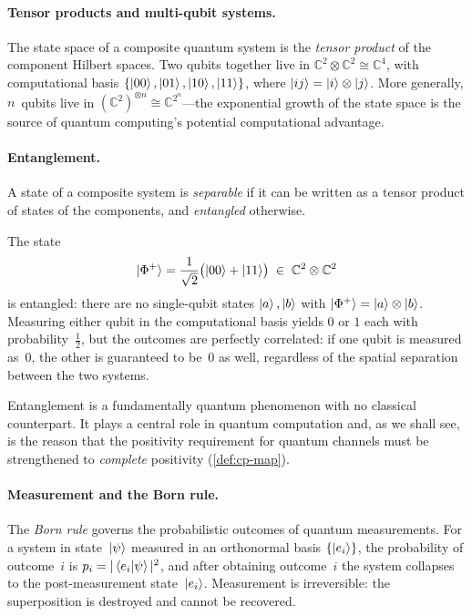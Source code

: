 \paragraph{Tensor products and multi-qubit systems.}
The state space of a composite quantum system is the \emph{tensor
product} of the component Hilbert spaces.
Two qubits together live in
$\mathbb{C}^2 \otimes \mathbb{C}^2 \cong \mathbb{C}^4$, with
computational basis
$\{\ket{00}, \ket{01}, \ket{10}, \ket{11}\}$,
where $\ket{ij} = \ket{i} \otimes \ket{j}$.
More generally, $n$~qubits live in
$(\mathbb{C}^2)^{\otimes n} \cong \mathbb{C}^{2^n}$---the
exponential growth of the state space is the source of quantum
computing's potential computational advantage.

\paragraph{Entanglement.}
A state of a composite system is \emph{separable} if it can be written
as a tensor product of states of the components, and \emph{entangled}
otherwise.

\begin{example}
\label{ex:bell-state}
The state
\[
  \ket{\Phi^+}
  = \frac{1}{\sqrt{2}}\bigl(\ket{00} + \ket{11}\bigr)
  \;\in\; \mathbb{C}^2 \otimes \mathbb{C}^2
\]
is entangled: there are no single-qubit states $\ket{a}, \ket{b}$
with $\ket{\Phi^+} = \ket{a} \otimes \ket{b}$.
Measuring either qubit in the computational basis yields $0$ or $1$
each with probability~$\tfrac{1}{2}$, but the outcomes are perfectly
correlated: if one qubit is measured as~$0$, the other is
guaranteed to be~$0$ as well, regardless of the spatial separation
between the two systems.
\end{example}

\noindent
Entanglement is a fundamentally quantum phenomenon with no classical
counterpart.
It plays a central role in quantum computation and, as we shall see,
is the reason that the positivity requirement for quantum channels
must be strengthened to \emph{complete} positivity
(\cref{def:cp-map}).

\paragraph{Measurement and the Born rule.}
The \emph{Born rule} governs the probabilistic outcomes of quantum
measurements.
For a system in state~$\ket{\psi}$ measured in an orthonormal basis
$\{\ket{e_i}\}$, the probability of outcome~$i$ is
$p_i = |\braket{e_i|\psi}|^2$,
and after obtaining outcome~$i$ the system collapses to the
post-measurement state~$\ket{e_i}$.
Measurement is irreversible: the superposition is destroyed and
cannot be recovered.

